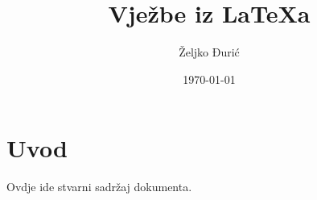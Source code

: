 \documentclass[12pt]{scrartcl}
\begin{document}
    \title{Vježbe iz \LaTeX a}
    \author{Željko Đurić}
    \date{\today}
    \maketitle
    \section{Uvod}
        Ovdje ide stvarni sadržaj dokumenta.
\end{document}
